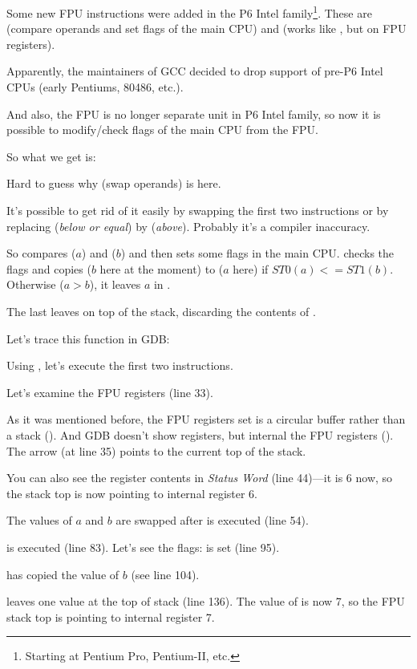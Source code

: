 \label{gcc481_o3}

Some new FPU instructions were added in the P6 Intel family\footnote{Starting at Pentium Pro, Pentium-II, etc.}.
These are  (compare operands and set flags of the main CPU) and 
 (works like , but on FPU registers).

Apparently, the maintainers of GCC decided to drop support of pre-P6 Intel CPUs (early Pentiums, 80486, etc.).

And also, the FPU is no longer separate unit in P6 Intel family, so now it is possible to modify/check flags of the main CPU from the FPU.

So what we get is:



Hard to guess why  (swap operands) is here.

It's possible to get rid of it easily by swapping the first two \FLD instructions or by replacing 
 (\emph{below or equal}) by  (\emph{above}).
Probably it's a compiler inaccuracy.

So  compares  ($a$) and  ($b$) 
and then sets some flags in the main CPU.
 checks the flags and copies  
($b$ here at the moment) to 
 ($a$ here) if $ST0 (a) <= ST1 (b)$.
Otherwise ($a>b$), it leaves $a$ in .

The last \FSTP leaves  on top of the stack, discarding the contents of .

Let's trace this function in GDB:



Using , 
let's execute the first two \FLD instructions.

Let's examine the FPU registers (line 33).

As it was mentioned before, the FPU registers set is a circular buffer rather than a stack ().
And GDB doesn't show  registers, but internal the FPU registers (). 
The arrow (at line 35) points to the current top of the stack.

You can also see the  register contents in \emph{Status Word} (line 44)---it is 6 now, 
so the stack top is now pointing to internal register 6.

The values of $a$ and $b$ are swapped after  is executed (line 54).

 is executed (line 83). 
Let's see the flags: \CF is set (line 95).

 has copied the value of $b$ (see line 104).

\FSTP leaves one value at the top of stack (line 136). 
The value of  is now 7, so the FPU stack top is pointing to internal register 7.

